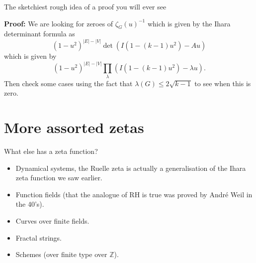 \documentclass{beamer}
\begin{document}
\begin{frame}{The sketchiest rough idea of a proof you will ever see}

{\bf Proof:}
We are looking for zeroes of $\zeta_G(u)^{-1}$ which is given by the Ihara determinant formula as
\[(1-u^2)^{|E| - |V|}\det(I(1-(k-1)u^2) - Au)\]
which is given by
\[(1-u^2)^{|E| - |V|}\prod_{\lambda}(I(1-(k-1)u^2) - \lambda u).\]
\pause Then check some cases using the fact that $\lambda(G) \le 2\sqrt{k-1}$ to see when this is zero.
\end{frame}

\section[More zetas]{More assorted zetas}

\begin{frame}{What else has a zeta function?}
\begin{itemize}
\pause\item Dynamical systems, the Ruelle zeta is actually a generalisation of the Ihara zeta function we saw earlier.
\pause\item Function fields (that the analogue of RH is true was proved by Andr\'e Weil in the 40's).
\pause\item Curves over finite fields.
\pause\item Fractal strings.
\pause\item Schemes (over finite type over $\mathbb{Z}$).
\end{itemize}
\end{frame}
\end{document}
